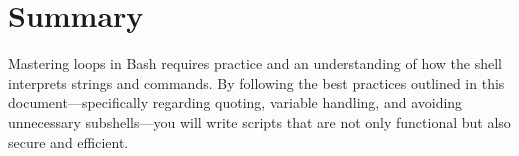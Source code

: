 \documentclass[12pt,a4paper]{article}
\begin{document}
	\section{Summary}
	Mastering loops in Bash requires practice and an understanding of how the shell interprets strings and commands. By following the best practices outlined in this document—specifically regarding quoting, variable handling, and avoiding unnecessary subshells—you will write scripts that are not only functional but also secure and efficient.
	
\end{document}
